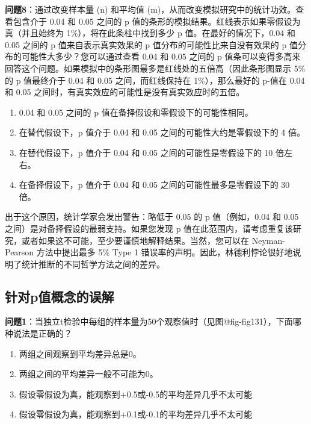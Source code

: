 \documentclass[
  letterpaper,
  DIV=11,
  numbers=noendperiod]{scrreprt}
\providecommand{\tightlist}{%
  \setlength{\itemsep}{0pt}\setlength{\parskip}{0pt}}\usepackage{longtable,booktabs,array}
\begin{document}
\textbf{问题8}：通过改变样本量 (n) 和平均值
(m)，从而改变模拟研究中的统计功效。查看包含介于 0.04 和 0.05 之间的 p
值的条形的模拟结果。红线表示如果零假设为真（并且始终为
1\%），将在此条柱中找到多少 p 值。在最好的情况下，0.04 和 0.05 之间的 p
值来自表示真实效果的 p 值分布的可能性比来自没有效果的 p
值分布的可能性大多少？您可以通过查看 0.04 和 0.05 之间的 p
值条可以变得多高来回答这个问题。如果模拟中的条形图最多是红线处的五倍高（因此条形图显示
5\% 的 p 值最终介于 0.04 和 0.05 之间，而红线保持在 1\%），那么最好的
p-值在 0.04 和 0.05 之间时，有真实效应的可能性是没有真实效应时的五倍。

\begin{enumerate}
\def\labelenumi{\Alph{enumi})}
\tightlist
\item
  0.04 和 0.05 之间的 p 值在备择假设和零假设下的可能性相同。
\item
  在替代假设下，p 值介于 0.04 和 0.05 之间的可能性大约是零假设下的 4
  倍。
\item
  在替代假设下，p 值介于 0.04 和 0.05 之间的可能性是零假设下的 10
  倍左右。
\item
  在备择假设下，p 值介于 0.04 和 0.05 之间的可能性最多是零假设下的 30
  倍。
\end{enumerate}

出于这个原因，统计学家会发出警告：略低于 0.05 的 p 值（例如，0.04 和
0.05 之间）是对备择假设的最弱支持。如果您发现 p
值在此范围内，请考虑重复该研究，或者如果这不可能，至少要谨慎地解释结果。当然，您可以在
Neyman-Pearson 方法中提出最多 5\% Type 1
错误率的声明。因此，林德利悖论很好地说明了统计推断的不同哲学方法之间的差异。

\hypertarget{ux9488ux5bf9pux503cux6982ux5ff5ux7684ux8befux89e3}{%
\subsection{针对p值概念的误解}\label{ux9488ux5bf9pux503cux6982ux5ff5ux7684ux8befux89e3}}

\textbf{问题1}：当独立t检验中每组的样本量为50个观察值时（见图@fig-fig131），下面哪种说法是正确的？

\begin{enumerate}
\def\labelenumi{\Alph{enumi})}
\tightlist
\item
  两组之间观察到平均差异总是0。
\item
  两组之间的平均差异一般不可能为0。
\item
  假设零假设为真，能观察到+0.5或-0.5的平均差异几乎不太可能
\item
  假设零假设为真，能观察到+0.1或-0.1的平均差异几乎不太可能
\end{enumerate}
\end{document}
